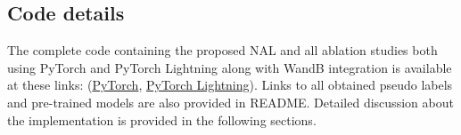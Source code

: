 



\subsection{Code details}

The complete code containing the proposed NAL and all ablation studies both using PyTorch \cite{pytorch} and PyTorch Lightning along with WandB \cite{wandb} integration is available at these links: (\href{https://anonymous.4open.science/r/BANA-60CA}{PyTorch}, \href{https://anonymous.4open.science/r/BANA-PL-60CA}{PyTorch Lightning}). Links to all obtained pseudo labels and pre-trained models are also provided in README. Detailed discussion about the implementation is provided in the following sections. 

